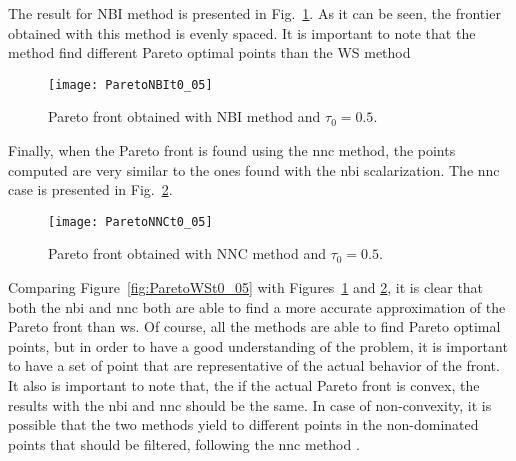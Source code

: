 The result for NBI method is presented in Fig.~\ref{fig:ParetoNBIt0_05}. As it can be seen, the frontier obtained with this method is evenly spaced. It is important to note that the method find different Pareto optimal points than the WS method
%
\begin{figure}[tb]%
\centering
\texttt{[image: ParetoNBIt0\_05]}%
\caption{Pareto front obtained with NBI method and $\tau_0=0.5$.}%
\label{fig:ParetoNBIt0_05}%
\end{figure}
%

Finally, when the Pareto front is found using the \gls{nnc} method, the points computed are very similar to the ones found with the \gls{nbi} scalarization. The \gls{nnc} case is presented in Fig.~\ref{fig:ParetoNNCt0_05}. 
%
\begin{figure}[tb]%
	\centering
	\texttt{[image: ParetoNNCt0\_05]}%
	\caption{Pareto front obtained with NNC method and $\tau_0=0.5$.}%
	\label{fig:ParetoNNCt0_05}%
\end{figure}
%
Comparing Figure~\ref{fig:ParetoWSt0_05} with Figures~\ref{fig:ParetoNBIt0_05} and \ref{fig:ParetoNNCt0_05}, it is clear that both the \gls{nbi} and \gls{nnc} both are able to find a more accurate approximation of the Pareto front than \gls{ws}. Of course, all the methods are able to find Pareto optimal points, but in order to have a good understanding of the problem, it is important to have a set of point that are representative of the actual behavior of the front. It also is important to note that, the if the actual Pareto front is convex, the results with the \gls{nbi} and \gls{nnc} should be the same. In case of non-convexity, it is possible that the two methods yield to different points in the non-dominated points that should be filtered, following the \gls{nnc} method \cite{Messac2003}.

